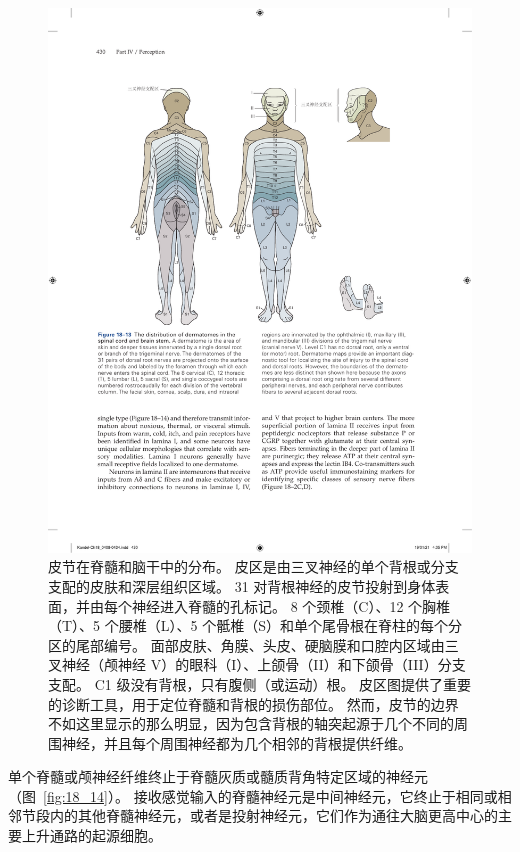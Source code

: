 \begin{figure}[htbp]
	\centering
	\includegraphics[width=1.0\linewidth]{chap18/fig_18_13}
	\caption{皮节在脊髓和脑干中的分布。 
		皮区是由三叉神经的单个背根或分支支配的皮肤和深层组织区域。 
		31 对背根神经的皮节投射到身体表面，并由每个神经进入脊髓的孔标记。 
		8 个颈椎（C）、12 个胸椎（T）、5 个腰椎（L）、5 个骶椎（S）和单个尾骨根在脊柱的每个分区的尾部编号。 
		面部皮肤、角膜、头皮、硬脑膜和口腔内区域由三叉神经（颅神经 V）的眼科（I）、上颌骨（II）和下颌骨（III）分支支配。 
		C1 级没有背根，只有腹侧（或运动）根。 
		皮区图提供了重要的诊断工具，用于定位脊髓和背根的损伤部位。 
		然而，皮节的边界不如这里显示的那么明显，因为包含背根的轴突起源于几个不同的周围神经，并且每个周围神经都为几个相邻的背根提供纤维。}
	\label{fig:18_13}
\end{figure}


单个脊髓或颅神经纤维终止于脊髓灰质或髓质背角特定区域的神经元（图~\ref{fig:18_14}）。
接收感觉输入的脊髓神经元是中间神经元，它终止于相同或相邻节段内的其他脊髓神经元，或者是投射神经元，它们作为通往大脑更高中心的主要上升通路的起源细胞。


